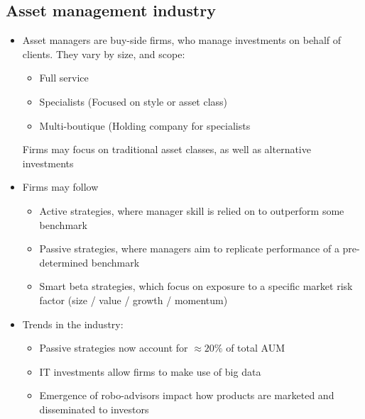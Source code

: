 \documentclass[../notes_compiled.tex]{subfiles}
\begin{document}
\subsection{Asset management industry}
\begin{itemize}
\item Asset managers are buy-side firms, who manage investments on behalf of clients. They vary by size, and scope:
\begin{itemize}
\item Full service
\item Specialists (Focused on style or asset class)
\item Multi-boutique (Holding company for specialists
\end{itemize}
Firms may focus on traditional asset classes, as well as alternative investments
\item Firms may follow
\begin{itemize}
\item Active strategies, where manager skill is relied on to outperform some benchmark
\item Passive strategies, where managers aim to replicate performance of a pre-determined benchmark
\item Smart beta strategies, which focus on exposure to a specific market risk factor (size / value / growth / momentum)
\end{itemize}
\item Trends in the industry:
\begin{itemize}
\item Passive strategies now account for $\approx20\%$ of total AUM
\item IT investments allow firms to make use of big data
\item Emergence of robo-advisors impact how products are marketed and disseminated to investors
\end{itemize}
\end{itemize}
\end{document}
